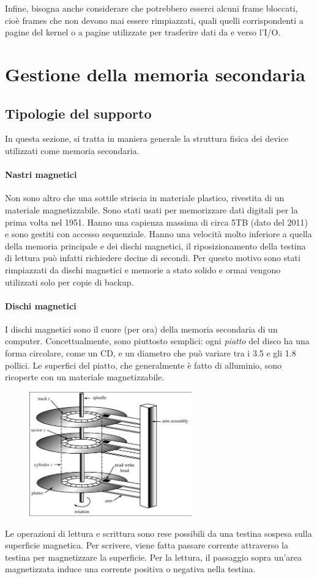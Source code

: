 \documentclass[a4paper]{article}
\begin{document}
Infine, bisogna anche considerare che potrebbero esserci alcuni frame bloccati, cioè frames che non devono mai essere rimpiazzati, quali quelli corrispondenti a pagine del kernel o a pagine utilizzate per trasferire dati da e verso l'I/O.

\newpage
\section{Gestione della memoria secondaria}

\subsection{Tipologie del supporto}
In questa sezione, si tratta in maniera generale la struttura fisica dei device utilizzati come memoria secondaria.

\paragraph{Nastri magnetici}
Non sono altro che una sottile striscia in materiale plastico, rivestita di un materiale magnetizzabile. Sono stati usati per memorizzare dati digitali per la prima volta nel 1951. Hanno una capienza massima di circa 5TB (dato del 2011) e sono gestiti con accesso sequenziale. Hanno una velocità molto inferiore a quella della memoria principale e dei dischi magnetici, il riposizionamento della testina di lettura può infatti richiedere decine di secondi. Per questo motivo sono stati rimpiazzati da dischi magnetici e memorie a stato solido e ormai vengono utilizzati solo per copie di backup.

\paragraph{Dischi magnetici}
I dischi magnetici sono il cuore (per ora) della memoria secondaria di un computer. Concettualmente, sono piuttosto semplici: ogni \textit{piatto} del disco ha una forma circolare, come un CD, e un diametro che può variare tra i 3.5 e gli 1.8 pollici. Le superfici del piatto, che generalmente è fatto di alluminio, sono ricoperte con un materiale magnetizzabile.

\begin{figure}
   \includegraphics[width=7cm]{img/disk.JPG}
\end{figure}
Le operazioni di lettura e scrittura sono rese possibili da una testina sospesa sulla superficie magnetica. Per scrivere, viene fatta passare corrente attraverso la testina per magnetizzare la superficie. Per la lettura, il passaggio sopra un'area magnetizzata induce una corrente positiva o negativa nella testina.
\end{document}
